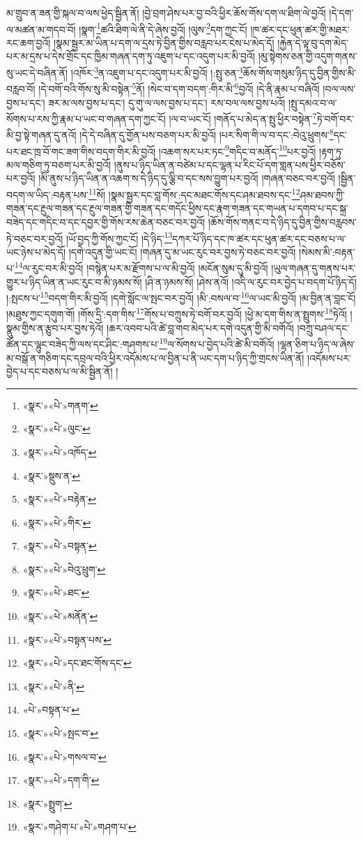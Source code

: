 མ་གྲུབ་ན་ཟན་གྱི་སྐལ་བ་ལས་ཕྱེད་སྦྱིན་ནོ། །བྱེ་བྲག་ཤེས་པར་བྱ་བའི་ཕྱིར་ཆོས་གོས་དག་ལ་ཐིག་ལེ་བྱའོ། །དེ་དག་ལ་མཚན་མ་གདབ་བོ། །སྣག་\footnote{«སྣར་»«པེ་»གནག་}ཚའི་ཐིག་ལེ་ནི་དེ་ཞེས་བྱའོ། །ལུས་\footnote{«སྣར་»«པེ་»ལུང་}དག་ཀྱང་ངོ། །ཁ་ཚར་དང་ཕུན་ཚར་གྱི་མཐར་རང་ཆག་བྱའོ། །སྣམ་སྦྱར་མ་ཡིན་པ་དག་ལ་དྲས་ཏེ་བྱིན་གྱིས་བརླབ་པར་ངེས་པ་མེད་དོ། །རྐྱེན་དེ་ལྟ་བུ་དག་མེད་པར་མ་དྲས་པ་དེས་གྲོང་དང་ཁྱིམ་གཞན་དག་ཏུ་འཇུག་པ་དང་འདུག་པར་མི་བྱའོ། །མུ་སྟེགས་ཅན་གྱི་འདུག་གནས་སུ་ཡང་དེ་བཞིན་ནོ། །འཁོར་\footnote{«སྣར་»«པེ་»འཁོད་}ན་འཇུག་པ་དང་འདུག་པར་མི་བྱའོ། །:སྤུ་ཅན་\footnote{«སྣར་»སྡུས་ན་}ཆོས་གོས་གསུམ་ཉིད་དུ་བྱིན་གྱིས་མི་བརླབ་བོ། །དེ་བགོ་བའི་གོས་སུ་མི་བསྟེན་\footnote{«སྣར་»«པེ་»བརྟེན་}ནོ། །སེང་བ་དག་བདག་:གིར་མི་\footnote{«སྣར་»«པེ་»གིར་}བྱའོ། །དེ་ནི་རྣམ་པ་བཞིའོ། །བལ་ལས་བྱས་པ་དང་། ཟར་མ་ལས་བྱས་པ་དང་། དུ་གུ་ལ་ལས་བྱས་པ་དང་། རས་བལ་ལས་བྱས་པའོ། །སྤུ་དམའ་བ་ལ་སོགས་པ་རས་ཀྱི་རྣམ་པ་ཡང་བ་གཞན་དག་ཀྱང་ངོ། །ལ་བ་ཡང་ངོ། །གནོད་པ་མེད་ན་སྤུ་ཕྱིར་བསྟེན་\footnote{«སྣར་»«པེ་»བསྟན་}ཏེ་བགོ་བར་མི་བྱ་སྟེ་གཞན་དུ་ནའོ། །དེ་དེ་བཞིན་དུ་གྱོན་པས་བཅག་པར་མི་བྱའོ། །པར་སིག་གི་ལ་བ་དང་:བེའུ་ཕྲུགས་\footnote{«སྣར་»«པེ་»བེའུ་ཕྲུག་}དང་པར་ཐང་ཁྲ་བོ་གང་ཟག་གིས་བདག་གིར་མི་བྱའོ། །འཆག་སར་པར་ཏང་\footnote{«སྣར་»«པེ་»ཐང་}གདིང་བ་མནོད་\footnote{«སྣར་»«པེ་»མནོན་}པར་བྱའོ། །རྟག་ཏུ་མལ་གཅིག་ཏུ་བཅག་པར་མི་བྱའོ། །ནུས་པ་ཉིད་ཡིན་ན་བཙེམ་པ་དང་ལྷན་པ་རིང་པོ་དག་གླན་པས་ཕྱིར་བཅོས་པར་བྱའོ། །མི་ནུས་པ་ཉིད་ཡིན་ན་འཆག་ས་དེ་ཉིད་དུ་ལྕི་བ་དང་སས་བྱུག་པར་བྱའོ། །གཞན་བཅང་བར་བྱའོ། །སྦྱིན་བདག་ལ་ཡིད་:བརྟན་པས་\footnote{«སྣར་»«པེ་»བསྟན་པས་}སོ། །སྣམ་སྦྱར་དང་བླ་གོས་:དང་མཐང་གོས་དང་ཤམ་ཐབས་དང་\footnote{«སྣར་»«པེ་»དང་ཐང་གོས་དང་}ཤམ་ཐབས་ཀྱི་གཟན་དང་རྔུལ་གཟན་དང་རྔུལ་གཟན་གྱི་གཟན་དང་གདོང་ཕྱིས་དང་རྣག་གཟན་དང་གཡན་པ་དགབ་པ་དང་སྐྲ་བཟེད་དང་གདིང་བ་དང་དབྱར་གྱི་གོས་རས་ཆེན་བཅང་བར་བྱའོ། །ཆོས་གོས་གནང་བ་དེ་ཉིད་དུ་བྱིན་གྱིས་བརླབས་ཏེ་བཅང་བར་བྱའོ། །ཡོ་བྱད་ཀྱི་གོས་ཀྱང་ངོ། །དེ་ཉིད་\footnote{«སྣར་»«པེ་»ནི་}དཀར་པོ་ཉིད་དང་ཁ་ཚར་དང་ཕུན་ཚར་དང་བཅས་པ་ལ་ཡང་ཉེས་པ་མེད་དོ། །དགེ་འདུན་གྱི་ཡང་ངོ། །གཞན་དུ་མ་ཡང་རུང་བར་བྱས་ཏེ་བཅང་བར་བྱའོ། །སེམས་མི་:བརྟན་པ་\footnote{«པེ་»བསྟན་པ་}ལ་རུང་བར་མི་བྱའོ། །བསྙེན་པར་མ་རྫོགས་པ་ལ་མི་བྱའོ། །མངོན་སུམ་དུ་མི་བྱའོ། །ཡུལ་གཞན་དུ་གནས་པར་གྱུར་པ་ཉིད་ཡིན་ན་ཡང་རུང་བ་མི་ཉམས་སོ། །ཤི་ན་ཉམས་སོ། །ཤེས་ནའོ། །འདི་ལ་རུང་བར་བྱེད་པ་བདག་པོ་ཉིད་དོ། །:སྤངས་པ་\footnote{«སྣར་»«པེ་»སྤང་བ་}བདག་གིར་མི་བྱའོ། །དགེ་སློང་ལ་སྤང་བར་བྱའོ། །མི་:བསལ་བ་\footnote{«སྣར་»«པེ་»གསལ་བ་}ལ་ཡང་མི་བྱའོ། །མ་བྱིན་ན་བླང་ངོ། །མཐུས་ཀྱང་དགུག་གོ། །གོས་དྲི་:དག་གིས་\footnote{«སྣར་»«པེ་»དག་གི་}གོས་པ་བཀྲུས་ཏེ་བགོ་བར་བྱའོ། །ཕྱེ་མ་དག་གིས་ན་སྤྲུགས་\footnote{«སྣར་»སྤྲུག་}ཏེའོ། །སྣུམ་གྱིས་ན་རྩུབ་པར་བྱས་ཏེའོ། །ཆར་འབབ་པའི་ཚེ་བླ་གབ་མེད་པར་དགེ་འདུན་གྱི་མི་བགོའོ། །བཀྲུ་བཤལ་དང་ཚོན་དང་ལྷུང་བཟེད་ཀྱི་ལས་དང་ཤིང་:གཤགས་པ་\footnote{«སྣར་»གཤེག་པ་«པེ་»གཤག་པ་}ལ་སོགས་པ་བྱེད་པའི་ཚེ་མི་བགོའོ། །ལྷན་ཅིག་པ་ཉིད་ལ་ཞེས་མ་བསྒོ་ན་གཅིག་དང་དབྲལ་བའི་ཕྱིར་འདོམས་པ་ལ་བྱིན་པ་ནི་ཡང་དག་པ་ཉིད་ཀྱི་གྲངས་ཡིན་ནོ། །འདོམས་པར་བྱེད་པ་དང་བཅས་པ་ལ་མི་སྦྱིན་ནོ། །
